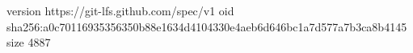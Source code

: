 version https://git-lfs.github.com/spec/v1
oid sha256:a0c70116935356350b88e1634d4104330e4aeb6d646bc1a7d577a7b3ca8b4145
size 4887
